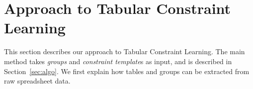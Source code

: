 \documentclass{sig-alternate-05-2015}
\newcommand{\constraints}{\ensuremath{\mathcal{T}}\xspace}
\newcommand{\format}[1]{\textit{#1}\xspace}
\newcommand{\template}{\format{constraint template}}
\newcommand{\dependencies}{\ensuremath{\mathcal{D}}\xspace}
\newcommand{\groups}{\ensuremath{\mathcal{G}}\xspace}
\begin{document}
%



\newcommand{\tcl}{Tabular Constraint Learning}
\section{Approach to Tabular Constraint Learning}
This section describes our approach to \tcl. The main method takes \textit{groups} and {\template}s as input, and is described in Section~\ref{sec:algo}. We first explain how tables and groups can be extracted from raw spreadsheet data.
\end{document}
